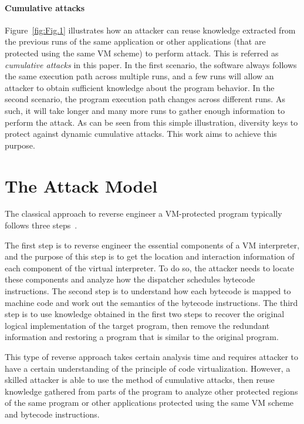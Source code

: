 \documentclass[times]{secauth}
\begin{document}
\paragraph*{Cumulative attacks}
Figure~\ref{fig:Fig.1} illustrates how an attacker
can reuse knowledge extracted from the previous runs of the same application or
other applications (that are protected using the same VM scheme) to perform attack.
This is referred as \emph{cumulative attacks} in this paper.
In the first scenario, the software always follows the same execution path
across multiple runs, and a few runs will allow an attacker to
obtain sufficient knowledge about the program behavior. In the second
scenario, the program execution path changes across different runs. As such,
it will take longer and many more runs to gather enough information to
perform the attack. As can be seen from this simple illustration, diversity keys to
protect against dynamic cumulative attacks. This work aims to achieve this purpose.




\section{The Attack Model\label{sec:attack}}
The classical approach to reverse engineer a VM-protected program typically
follows three steps~\cite{10falliere2009inside,17rolles2009unpacking}. %

The first step is to reverse engineer the essential components of a VM interpreter,
and the purpose of this step is to get the location and interaction information of each
component of the virtual interpreter. To do so, the attacker needs to locate
these components and analyze how the dispatcher schedules bytecode instructions.
The second step is to understand how each bytecode is mapped to machine code
and work out the semantics of the bytecode instructions.
The third step is to use knowledge obtained in the first two steps to recover the original
logical implementation of the target program, then remove the redundant information
and restoring a program that is similar to the original program.


This type of reverse approach takes certain analysis time and requires attacker to
have a certain understanding of the principle of code virtualization.
However, a skilled attacker is able to use the method of cumulative attacks, then reuse knowledge
gathered from parts of the program to analyze other protected regions of
the same program or other applications protected using the same VM scheme and bytecode instructions.
\end{document}
